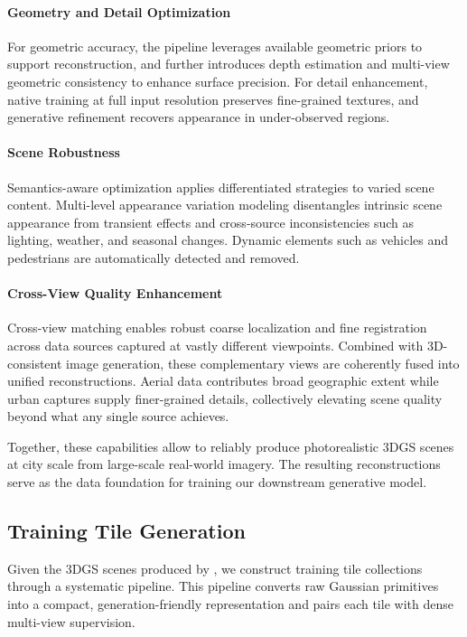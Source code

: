 \paragraph{Geometry and Detail Optimization}
For geometric accuracy, the pipeline leverages available geometric priors to support reconstruction, and further introduces depth estimation and multi-view geometric consistency to enhance surface precision. For detail enhancement, native training at full input resolution preserves fine-grained textures, and generative refinement recovers appearance in under-observed regions.

\paragraph{Scene Robustness}
Semantics-aware optimization applies differentiated strategies to varied scene content. Multi-level appearance variation modeling disentangles intrinsic scene appearance from transient effects and cross-source inconsistencies such as lighting, weather, and seasonal changes. Dynamic elements such as vehicles and pedestrians are automatically detected and removed.

\paragraph{Cross-View Quality Enhancement}
Cross-view matching enables robust coarse localization and fine registration across data sources captured at vastly different viewpoints. Combined with 3D-consistent image generation, these complementary views are coherently fused into unified reconstructions. Aerial data contributes broad geographic extent while urban captures supply finer-grained details, collectively elevating scene quality beyond what any single source achieves.

Together, these capabilities allow \abotgs to reliably produce photorealistic 3DGS scenes at city scale from large-scale real-world imagery. The resulting reconstructions serve as the data foundation for training our downstream generative model.

\subsection{Training Tile Generation}
\label{sec:training_data}

Given the 3DGS scenes produced by \abotgs, we construct training tile collections through a systematic pipeline. This pipeline converts raw Gaussian primitives into a compact, generation-friendly representation and pairs each tile with dense multi-view supervision.

